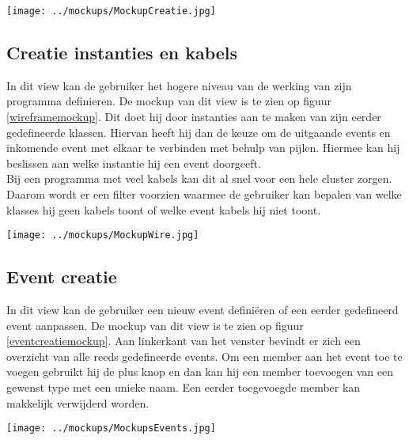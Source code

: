 \documentclass[]{article}
\begin{document}
 \begin{sidewaysfigure}
  \centering
   
\texttt{[image: ../mockups/MockupCreatie.jpg]}
  \caption{Mockup creatie klasse.}
  \label{creatieklassemockup}
\end{sidewaysfigure}
\clearpage
\subsection{Creatie instanties en kabels}
In dit view kan de gebruiker het hogere niveau van de werking van zijn programma definieren. De mockup van dit view is te zien op figuur \ref{wireframemockup}. Dit doet hij door instanties aan te maken van zijn eerder gedefineerde klassen. Hiervan heeft hij dan de keuze om de uitgaande events en inkomende event met elkaar te verbinden met behulp van pijlen. Hiermee kan hij beslissen aan welke instantie hij een event doorgeeft.\\ Bij een programma met veel kabels kan dit al snel voor een hele cluster zorgen. Daarom wordt er een filter voorzien waarmee de gebruiker kan bepalen van welke klasses hij geen kabels toont of welke event kabels hij niet toont.
\clearpage
 \begin{sidewaysfigure}
  \centering
   
\texttt{[image: ../mockups/MockupWire.jpg]}
  \caption{Mockup WireFrame.}
  \label{wireframemockup}
\end{sidewaysfigure}
\clearpage
\subsection{Event creatie}
In dit view kan de gebruiker een nieuw event defini\"{e}ren of een eerder gedefineerd event aanpassen. De mockup van dit view is te zien op figuur \ref{eventcreatiemockup}. Aan linkerkant van het venster bevindt er zich een overzicht van alle reeds gedefineerde events. Om een member aan het event toe te voegen gebruikt hij de plus knop en dan kan hij een member toevoegen van een gewenst type met een unieke naam. Een eerder toegevoegde member kan makkelijk verwijderd worden.
\clearpage
 \begin{sidewaysfigure}
  \centering
   
\texttt{[image: ../mockups/MockupsEvents.jpg]}
  \caption{Mockup creatie event.}
  \label{eventcreatiemockup}
\end{sidewaysfigure}
\clearpage
\end{document}
